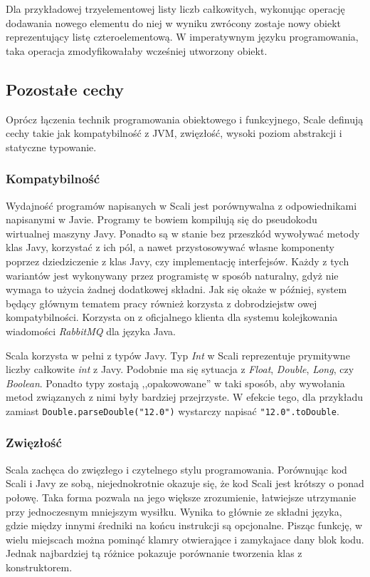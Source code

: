 \documentclass[brudnopis]{xmgr}
\begin{document}
Dla przykładowej trzyelementowej listy liczb całkowitych, wykonując operację dodawania nowego elementu do niej w wyniku zwrócony zostaje nowy obiekt reprezentujący listę czteroelementową. W imperatywnym języku programowania, taka operacja zmodyfikowałaby wcześniej utworzony obiekt. 

\subsection{Pozostałe cechy}

Oprócz łączenia technik programowania obiektowego i funkcyjnego, Scale definują cechy takie jak kompatybilność z JVM, zwięzłość, wysoki poziom abstrakcji i statyczne typowanie. 

\subsubsection{Kompatybilność}

Wydajność programów napisanych w Scali jest porównywalna z odpowiednikami napisanymi w Javie. Programy te bowiem kompilują się do pseudokodu wirtualnej maszyny Javy. Ponadto są w stanie bez przeszkód wywoływać metody klas Javy, korzystać z ich pól, a nawet przystosowywać własne komponenty poprzez dziedziczenie z klas Javy, czy implementację interfejsów. Każdy z tych wariantów jest wykonywany przez programistę w sposób naturalny, gdyż nie wymaga to użycia żadnej dodatkowej składni. Jak się okaże w później, system będący głównym tematem pracy również korzysta z dobrodziejstw owej kompatybilności. Korzysta on z oficjalnego klienta dla systemu kolejkowania wiadomości \emph{RabbitMQ} dla języka Java.

Scala korzysta w pełni z typów Javy. Typ \emph{Int} w Scali reprezentuje prymitywne liczby całkowite \emph{int} z Javy. Podobnie ma się sytuacja z \emph{Float}, \emph{Double}, \emph{Long}, czy \emph{Boolean}. Ponadto typy zostają ,,opakowowane'' w taki sposób, aby wywołania metod związanych z nimi były bardziej przejrzyste. W efekcie tego, dla przykładu zamiast \texttt{Double.parseDouble("12.0")} wystarczy napisać \texttt{"12.0".toDouble}.

\subsubsection{Zwięzłość}

Scala zachęca do zwięzłego i czytelnego stylu programowania. Porównując kod Scali i Javy ze sobą, niejednokrotnie okazuje się, że kod Scali jest krótszy o ponad połowę. Taka forma pozwala na jego większe zrozumienie, łatwiejsze utrzymanie przy jednoczesnym mniejszym wysiłku. Wynika to głównie ze składni języka, gdzie między innymi średniki na końcu instrukcji są opcjonalne. Pisząc funkcję, w wielu miejscach można pominąć klamry otwierające i zamykajace dany blok kodu. Jednak najbardziej tą różnice pokazuje porównanie tworzenia klas z konstruktorem.
\end{document}
